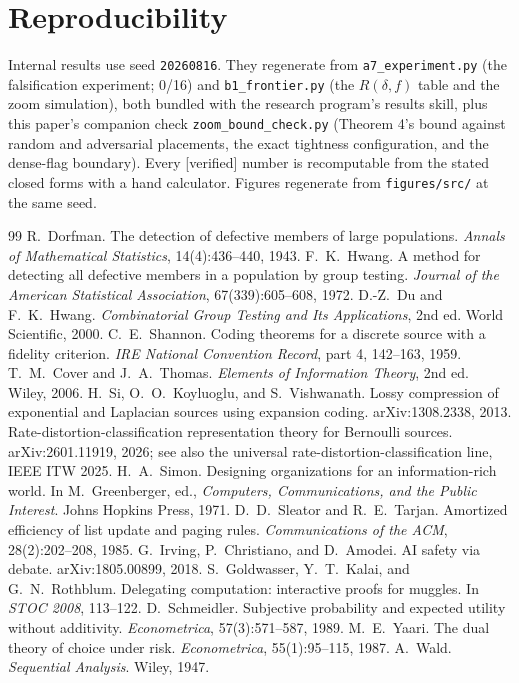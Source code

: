 \documentclass[11pt,a4paper]{article}
\begin{document}
\section{Reproducibility}\label{sec:repro}
Internal results use seed \texttt{20260816}. They regenerate from \texttt{a7\_experiment.py} (the falsification experiment; 0/16) and \texttt{b1\_frontier.py} (the $R(\delta,f)$ table and the zoom simulation), both bundled with the research program's results skill, plus this paper's companion check \texttt{zoom\_bound\_check.py} (Theorem 4's bound against random and adversarial placements, the exact tightness configuration, and the dense-flag boundary). Every [verified] number is recomputable from the stated closed forms with a hand calculator. Figures regenerate from \texttt{figures/src/} at the same seed.

\begin{thebibliography}{99}
 R.~Dorfman. The detection of defective members of large populations. \emph{Annals of Mathematical Statistics}, 14(4):436--440, 1943.
 F.~K.~Hwang. A method for detecting all defective members in a population by group testing. \emph{Journal of the American Statistical Association}, 67(339):605--608, 1972.
 D.-Z.~Du and F.~K.~Hwang. \emph{Combinatorial Group Testing and Its Applications}, 2nd ed. World Scientific, 2000.
 C.~E.~Shannon. Coding theorems for a discrete source with a fidelity criterion. \emph{IRE National Convention Record}, part 4, 142--163, 1959.
 T.~M.~Cover and J.~A.~Thomas. \emph{Elements of Information Theory}, 2nd ed. Wiley, 2006.
 H.~Si, O.~O.~Koyluoglu, and S.~Vishwanath. Lossy compression of exponential and Laplacian sources using expansion coding. arXiv:1308.2338, 2013.
 Rate-distortion-classification representation theory for Bernoulli sources. arXiv:2601.11919, 2026; see also the universal rate-distortion-classification line, IEEE ITW 2025.
 H.~A.~Simon. Designing organizations for an information-rich world. In M.~Greenberger, ed., \emph{Computers, Communications, and the Public Interest}. Johns Hopkins Press, 1971.
 D.~D.~Sleator and R.~E.~Tarjan. Amortized efficiency of list update and paging rules. \emph{Communications of the ACM}, 28(2):202--208, 1985.
 G.~Irving, P.~Christiano, and D.~Amodei. AI safety via debate. arXiv:1805.00899, 2018.
 S.~Goldwasser, Y.~T.~Kalai, and G.~N.~Rothblum. Delegating computation: interactive proofs for muggles. In \emph{STOC 2008}, 113--122.
 D.~Schmeidler. Subjective probability and expected utility without additivity. \emph{Econometrica}, 57(3):571--587, 1989.
 M.~E.~Yaari. The dual theory of choice under risk. \emph{Econometrica}, 55(1):95--115, 1987.
 A.~Wald. \emph{Sequential Analysis}. Wiley, 1947.
\end{thebibliography}
\end{document}
